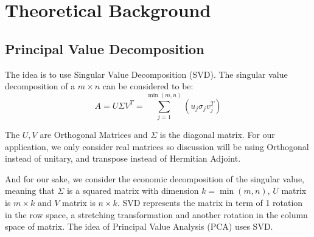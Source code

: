 \documentclass{article}
\begin{document}
\section{Theoretical Background}
    \subsection{Principal Value Decomposition}
        \hspace{1.1em}
        The idea is to use Singular Value Decomposition (SVD). The singular value decomposition of a $m\times n$ can be considered to be: 
        \begin{equation*}\tag{1}\label{eqn:1}
            A = U\Sigma V^T = \sum_{j = 1}^{\min(m, n)}\left(
                u_j \sigma_j v_j^T
            \right)
        \end{equation*}
        \par
        The $U, V$ are Orthogonal Matrices and $\Sigma$ is the diagonal matrix. For our application, we only consider real matrices so discussion will be using Orthogonal instead of unitary, and transpose instead of Hermitian Adjoint. 
        \par
        And for our sake, we consider the economic decomposition of the singular value, meaning that $\Sigma$ is a squared matrix with dimension $k = \min(m, n)$, $U$ matrix is $m \times k$ and $V$ matrix is $n\times k$. SVD represents the matrix in term of 1 rotation in the row space, a stretching transformation and another rotation in the column space of matrix. The idea of Principal Value Analysis (PCA) uses SVD. 
\end{document}
